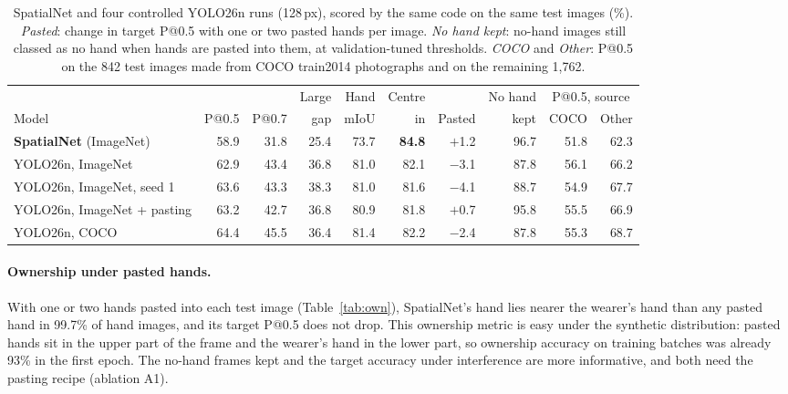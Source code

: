 \begin{table}[h]
  \caption{SpatialNet and four controlled YOLO26n runs (128\,px), scored by the same code on the same test images (\%). \emph{Pasted}: change in target P@0.5 with one or two pasted hands per image. \emph{No hand kept}: no-hand images still classed as no hand when hands are pasted into them, at validation-tuned thresholds. \emph{COCO} and \emph{Other}: P@0.5 on the 842 test images made from COCO train2014 photographs and on the remaining 1,762.}
  \label{tab:controlled}
  \footnotesize
  \setlength{\tabcolsep}{2.6pt}
  \begin{tabular}{lrrrrrrrrr}
    \toprule
    & & & Large & Hand & Centre & & No hand & \multicolumn{2}{c}{P@0.5, source} \\
    \cmidrule(l){9-10}
    Model & P@0.5 & P@0.7 & gap & mIoU & in & Pasted & kept & COCO & Other \\
    \midrule
    \textbf{SpatialNet} (ImageNet) & 58.9 & 31.8 & 25.4 & 73.7 & \textbf{84.8} & $+$1.2 & 96.7 & 51.8 & 62.3 \\
    YOLO26n, ImageNet & 62.9 & 43.4 & 36.8 & 81.0 & 82.1 & $-$3.1 & 87.8 & 56.1 & 66.2 \\
    YOLO26n, ImageNet, seed 1 & 63.6 & 43.3 & 38.3 & 81.0 & 81.6 & $-$4.1 & 88.7 & 54.9 & 67.7 \\
    YOLO26n, ImageNet + pasting & 63.2 & 42.7 & 36.8 & 80.9 & 81.8 & $+$0.7 & 95.8 & 55.5 & 66.9 \\
    YOLO26n, COCO & 64.4 & 45.5 & 36.4 & 81.4 & 82.2 & $-$2.4 & 87.8 & 55.3 & 68.7 \\
    \bottomrule
  \end{tabular}
\end{table}

\paragraph{Ownership under pasted hands.} With one or two hands pasted into each test image (Table~\ref{tab:own}), SpatialNet's hand lies nearer the wearer's hand than any pasted hand in 99.7\% of hand images, and its target P@0.5 does not drop. This ownership metric is easy under the synthetic distribution: pasted hands sit in the upper part of the frame and the wearer's hand in the lower part, so ownership accuracy on training batches was already 93\% in the first epoch. The no-hand frames kept and the target accuracy under interference are more informative, and both need the pasting recipe (ablation A1).

